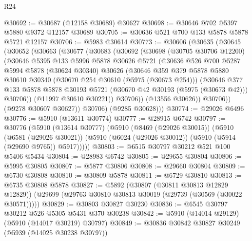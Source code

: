 \begin{lexlean}{R24}
\begin{coremodule}
@30692 := @30687 (@12158 @30689) @30627
@30698 := @30646 @702 @5397 @5880 @9372 @12157 @30689
@30705 := @30636 @521 @700 @133 @5878 @5878 @5721 @12157
@30706 := @5983 @30614
@30773 := @30606
    (@30635
      (@30645
        (@30652
          (@30663
            (@30677
              (@30683
                (@30692
                  (@30698
                    (@30705 @30706 @12200)
                    (@30646
                      @5395
                      @133
                      @5996
                      @5878
                      @30626
                      @5721
                      (@30636
                        @526
                        @700
                        @5287
                        @5994
                        @5878
                        (@30624 @30340)
                        @30626
                        (@30646
                          @359
                          @379
                          @5878
                          @5880
                          @30610
                          @30340
                          (@30670 @254 @30610 (@5975 (@30673 @254)))
                          (@30646
                            @377
                            @133
                            @5878
                            @5878
                            @30193
                            @5721
                            (@30670 @42 @30193 (@5975 (@30673 @42)))
                            @30706))
                        (@11997 @30610 @30221))
                      @30706))
                  (@13556 @30626))
                @30706))
            (@9278 @30607 @30627))
          @30706)
        (@9285 @30628)))
@30774 := @29026 @6496
@30776 := @5910 (@13611 @30774)
@30777 := @28915 @6742
@30797 := @30776
    (@5910
      (@13614 @30777)
      (@5910
        (@8469 (@29026 @30015))
        (@5910
          (@6581 (@29026 @30021))
          (@5910 (@6024 (@29026 @30012)) (@5910 (@5914 (@29690 @9765)) @5917)))))
@30803 := @6515 @30797 @30212 @521 @100 @5406 @5434
@30804 := @28983 @6742
@30805 := @29655 @30804
@30806 := @5995 @30805
@30807 := @5877 @30806
@30808 := @29660 @30804
@30809 := @6730 @30808
@30810 := @30809 @5878
@30811 := @6729 @30810
@30813 := @6735 @30808 @5878
@30827 := @5892
    (@30807 (@30811 @30813 @12829 @12829))
    (@29699 (@29763 @30810 @30813 @30019 (@29739 (@30569 (@30022 @30571)))))
@30829 := @30803 @30827 @30230
@30836 := @6545 @30797 @30212 @526 @5305 @5431 @370 @30238
@30842 := @5910 (@14014 @29129) (@5910 (@14017 @30219) @30797)
@30849 := @30836 @30842 @30827 @30249 (@5939 (@14025 @30238 @30797))

\end{coremodule}
\end{lexlean}
